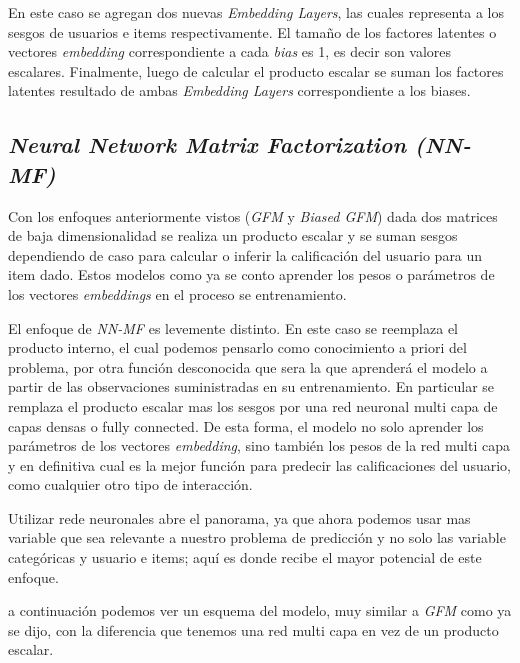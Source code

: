 \documentclass[11pt,a4paper,twoside]{thesis}
\begin{document}
En este caso se agregan dos nuevas \textit{Embedding Layers}, las cuales representa a los sesgos de usuarios e items respectivamente. El tamaño de los factores latentes o vectores \textit{embedding} correspondiente a cada \textit{bias} es 1, es decir son valores escalares. Finalmente, luego de calcular el producto escalar se suman los factores latentes resultado de ambas \textit{Embedding Layers} correspondiente a los biases.  


\clearpage

\subsection{\textit{Neural Network Matrix Factorization (NN-MF)}}

Con los enfoques anteriormente vistos (\textit{GFM} y \textit{Biased GFM}) dada dos matrices de baja dimensionalidad se realiza un producto escalar y se suman sesgos dependiendo de caso para calcular o inferir la calificación del usuario para un item dado. Estos modelos como ya se conto aprender los pesos o parámetros de los vectores \textit{embeddings} en el proceso se entrenamiento. 

El enfoque de {\textit{NN-MF}} \cite{nnfm} \cite{ncf} es levemente distinto. En este caso se reemplaza el producto interno, el cual podemos pensarlo como conocimiento a priori del problema, por otra función desconocida que sera la que aprenderá el modelo a partir de las observaciones suministradas en su entrenamiento. En particular se remplaza el producto escalar mas los sesgos por una red neuronal multi capa de capas densas o fully connected. De esta forma, el modelo no solo aprender los parámetros de los vectores \textit{embedding}, sino también los pesos de la red multi capa y en definitiva cual es la mejor función para predecir las calificaciones del usuario, como cualquier otro tipo de interacción.

Utilizar rede neuronales abre el panorama, ya que ahora podemos usar mas variable que sea relevante a nuestro problema de predicción y no solo las variable categóricas y usuario e items; aquí es donde recibe el mayor potencial de este enfoque.

a continuación podemos ver un esquema del modelo, muy similar a \textit{GFM} como ya se dijo, con la diferencia que tenemos una red multi capa en vez de un producto escalar.
\end{document}
